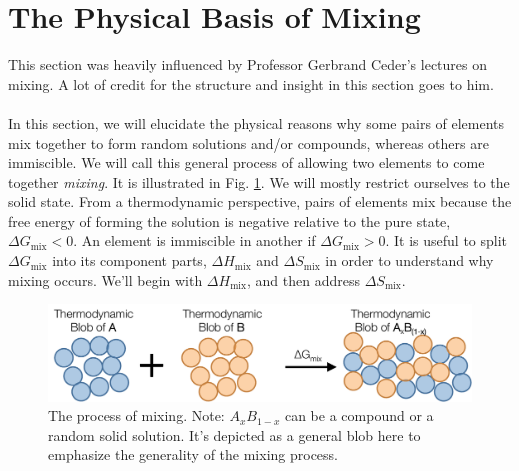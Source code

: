 \documentclass[12pt]{article}
\begin{document}
\section{The Physical Basis of Mixing}
This section was heavily influenced by Professor Gerbrand Ceder's lectures on mixing. A lot of credit for the structure and insight in this section goes to him.\\
\\
In this section, we will elucidate the physical reasons why some pairs of elements mix together to form random solutions and/or compounds, whereas others are immiscible. We will call this general process of allowing two elements to come together \emph{mixing}. It is illustrated in Fig. \ref{mixing_process}. We will mostly restrict ourselves to the solid state. From a thermodynamic perspective, pairs of elements mix because the free energy of forming the solution is negative relative to the pure state, $\Delta G_{\text{mix}} <0$. An element is immiscible in another if $\Delta G_{\text{mix}} >0$. It is useful to split $\Delta G_{\text{mix}}$ into its component parts, $\Delta H_{\text{mix}}$ and $\Delta S_{\text{mix}}$ in order to understand why mixing occurs. We'll begin with $\Delta H_{\text{mix}}$, and then address $\Delta S_{\text{mix}}$.  

\begin{figure}[h]
\centering
\includegraphics[width=\textwidth]{process_of_mixing}
\caption{The process of mixing. Note: $A_x B_{1-x}$ can be a compound or a random solid solution. It's depicted as a general blob here to emphasize the generality of the mixing process.}
\label{mixing_process}
\end{figure}
\end{document}
